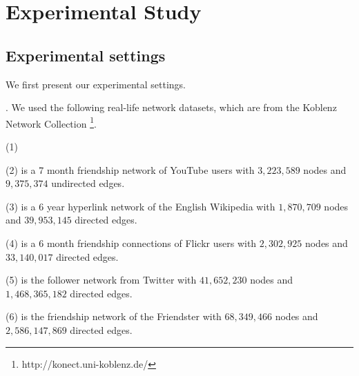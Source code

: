 \section{Experimental Study}
\label{sec-exp}



\subsection{Experimental settings}

We first present our experimental settings.

. We used the following real-life network datasets,
which are from the Koblenz Network Collection \footnote{http://konect.uni-koblenz.de/}.

\noindent (1) 

\noindent (2) \YouTube is a 7 month  friendship network of YouTube users
with $3,223,589$ nodes and $9,375,374$ undirected edges.

\noindent (3) \Wikipedia is a 6 year hyperlink network of the English Wikipedia
with $1,870,709$ nodes and $39,953,145$ directed edges.

\noindent (4) \Flickr is a 6 month friendship connections of Flickr users
with $2,302,925$ nodes and $33,140,017$ directed edges.

\noindent (5) \Twitter is the follower network from Twitter with $41,652,230$ nodes
  and $1,468,365,182$ directed edges.

\noindent (6) \Friendster is the friendship network of the Friendster with $68,349,466$
  nodes and $2,586,147,869$ directed edges.



